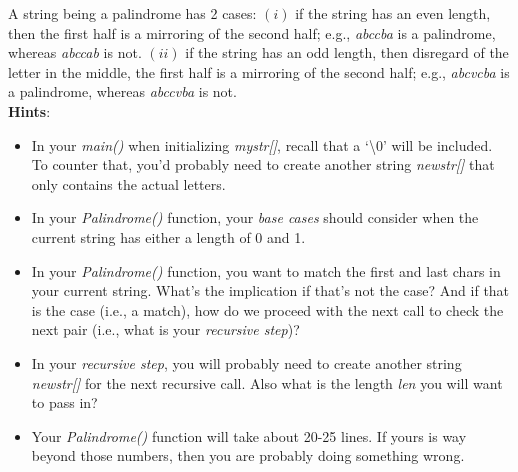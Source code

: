 \documentclass{article}
\begin{document}
\begin{enumerate}
    A string being a palindrome has 2 cases: $(i)$ if the string has an even length, then the first half is a mirroring of the second half; e.g., \textit{abccba} is a palindrome, whereas \textit{abccab} is not. $(ii)$ if the string has an odd length, then disregard of the letter in the middle, the first half is a mirroring of the second half; e.g., \textit{abcvcba} is a palindrome, whereas \textit{abccvba} is not.\\
    
    \textbf{Hints}: 
    \begin{itemize}
        \item In your \textit{main()} when initializing \textit{mystr[]}, recall that a `\textbackslash0' will be included. To counter that, you'd probably need to create another string \textit{newstr[]} that only contains the actual letters.\smallskip
        
        \item In your \textit{Palindrome()} function, your \textit{base cases} should consider when the current string has either a length of 0 and 1.\smallskip
        
        \item In your \textit{Palindrome()} function, you want to match the first and last chars in your current string. What's the implication if that's not the case? And if that is the case (i.e., a match), how do we proceed with the next call to check the next pair (i.e., what is your \textit{recursive step})?\smallskip
        
        \item In your \textit{recursive step}, you will probably need to create another string \textit{newstr[]} for the next recursive call. Also what is the length \textit{len} you will want to pass in?\smallskip
        
        \item Your \textit{Palindrome()} function will take about 20-25 lines. If yours is way beyond those numbers, then you are probably doing something wrong.
    \end{itemize}
    
    
    
    
\end{enumerate}
\end{document}
